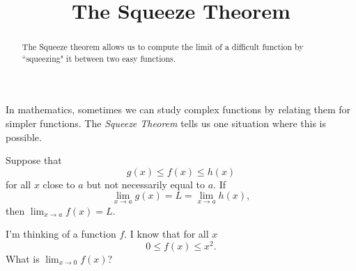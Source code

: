 \documentclass{ximera}
\title[Dig-In:]{The Squeeze Theorem}
\begin{document}
\begin{abstract}
The Squeeze theorem allows us to compute the limit of a difficult function by ``squeezing" it between two easy functions.
\end{abstract}
\maketitle

In mathematics, sometimes we can study complex functions by relating
them for simpler functions. The \textit{Squeeze Theorem} tells us one
situation where this is possible.

\begin{theorem}
  Suppose that
  \[
  g(x) \le f(x) \le h(x)
  \]
  for all $x$ close to $a$ but not necessarily equal to $a$. If
  \[
  \lim_{x\to a} g(x) = L = \lim_{x\to a} h(x),
  \]
  then $\lim_{x\to a} f(x) = L$.
\end{theorem}

\begin{question}
  I'm thinking of a function $f$. I know that for all $x$
  \[
  0 \le f(x) \le x^2.
  \]
  What is $\lim_{x\to 0} f(x)$?
  \begin{prompt}
  \begin{multipleChoice}
  \end{multipleChoice}
  \end{prompt}
\end{question}
\end{document}
